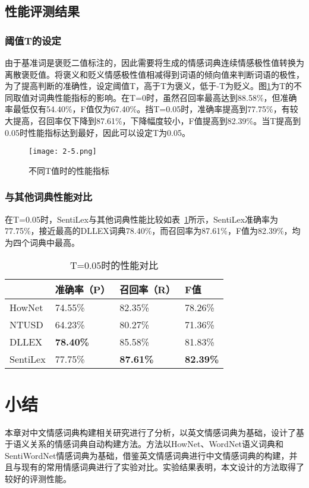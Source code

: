 \subsection{性能评测结果}
\subsubsection{阈值T的设定}
由于基准词是褒贬二值标注的，因此需要将生成的情感词典连续情感极性值转换为离散褒贬值。将褒义和贬义情感极性值相减得到词语的倾向值来判断词语的极性，为了提高判断的准确性，设定阈值T，高于T为褒义，低于-T为贬义。图\ref{fig2-5}为T的不同取值对词典性能指标的影响。在T=0时，虽然召回率最高达到88.58\%，但准确率最低仅有54.40\%，F值仅为67.40\%。挡T=0.05时，准确率提高到77.75\%，有较大提高，召回率仅下降到87.61\%，下降幅度较小，F值提高到82.39\%。当T提高到0.05时性能指标达到最好，因此可以设定T为0.05。

\begin{figure}[htp]
\centering
\texttt{[image: 2-5.png]}
\caption{不同T值时的性能指标}
\label{fig2-5}
\end{figure}

\subsubsection{与其他词典性能对比}
在T=0.05时，SentiLex与其他词典性能比较如表~\ref{tab2-1}所示，SentiLex准确率为77.75\%，接近最高的DLLEX词典78.40\%，而召回率为87.61\%，F值为82.39\%，均为四个词典中最高。
\begin{table}[htp]
\centering
\caption{T=0.05时的性能对比}
\label{tab2-1}
 \begin{tabular}{|l|l|l|l|}
 \hline
 &准确率（P）& 召回率（R）&F值\\
 \hline
 HowNet &74.55\%&82.35\%&78.26\%\\
NTUSD&64.23\%&80.27\%&71.36\%\\
DLLEX&\textbf{78.40\%}&85.58\%&81.83\%\\
SentiLex&77.75\%&\textbf{87.61\%}&\textbf{82.39\%}\\
 \hline
\end{tabular}
\end{table}

\section{小结}
本章对中文情感词典构建相关研究进行了分析，以英文情感词典为基础，设计了基于语义关系的情感词典自动构建方法。方法以HowNet、WordNet语义词典和SentiWordNet情感词典为基础，借鉴英文情感词典进行中文情感词典的构建，并且与现有的常用情感词典进行了实验对比。实验结果表明，本文设计的方法取得了较好的评测性能。